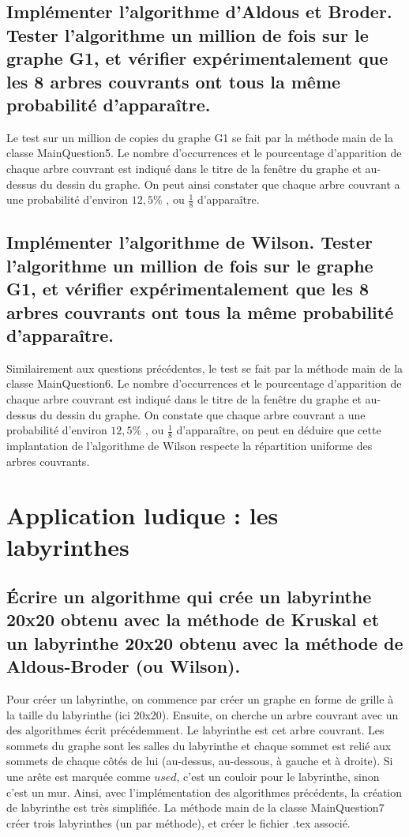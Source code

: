 \documentclass[11pt]{article}
\begin{document}
        \subsection{Implémenter l'algorithme d'Aldous et Broder.
        Tester l'algorithme un million de fois sur le graphe G1,
        et vérifier expérimentalement que les 8 arbres couvrants ont tous la même probabilité d'apparaître.}\label{subsec:Q5}
            Le test sur un million de copies du graphe G1 se fait par la méthode main de la classe MainQuestion5.
            Le nombre d'occurrences et le pourcentage d'apparition de chaque arbre couvrant est indiqué dans le titre de la fenêtre du graphe et au-dessus du dessin du graphe.
            On peut ainsi constater que chaque arbre couvrant a une probabilité d'environ $12,5\%$ , ou $\frac{1}{8}$ d'apparaître.
    
        \subsection{Implémenter l'algorithme de Wilson.
        Tester l'algorithme un million de fois sur le graphe G1,
        et vérifier expérimentalement que les 8 arbres couvrants ont tous la même probabilité d'apparaître.}\label{subsec:Q6}
            Similairement aux questions précédentes, le test se fait par la méthode main de la classe MainQuestion6.
            Le nombre d'occurrences et le pourcentage d'apparition de chaque arbre couvrant est indiqué dans le titre de la fenêtre du graphe et au-dessus du dessin du graphe.
            On constate que chaque arbre couvrant a une probabilité d'environ $12,5\%$ , ou $\frac{1}{8}$ d'apparaître,
            on peut en déduire que cette implantation de l'algorithme de Wilson respecte la répartition uniforme des arbres couvrants.

    \section{Application ludique : les labyrinthes}\label{sec:labyrinthes}
        \subsection{Écrire un algorithme qui crée un labyrinthe 20x20 obtenu avec la méthode de Kruskal
        et un labyrinthe 20x20 obtenu avec la méthode de Aldous-Broder (ou Wilson).}\label{subsec:Q7.}
            Pour créer un labyrinthe, on commence par créer un graphe en forme de grille à la taille du labyrinthe (ici 20x20).
            Ensuite, on cherche un arbre couvrant avec un des algorithmes écrit précédemment.
            Le labyrinthe est cet arbre couvrant.
            Les sommets du graphe sont les salles du labyrinthe et chaque sommet est relié aux sommets de chaque côtés de lui (au-dessus, au-dessous, à gauche et à droite).
            Si une arête est marquée comme $used$, c'est un couloir pour le labyrinthe, sinon c'est un mur.
            Ainsi, avec l'implémentation des algorithmes précédents, la création de labyrinthe est très simplifiée.
            La méthode main de la classe MainQuestion7 créer trois labyrinthes (un par méthode), et créer le fichier .tex associé.
\end{document}
